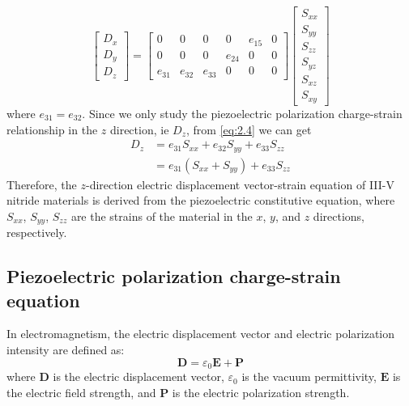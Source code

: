 \begin{equation}
\begin{bmatrix}
D_{x} \\
D_{y} \\
D_{z}
\end{bmatrix}=\begin{bmatrix}
0 & 0 & 0 & 0 & e_{15} & 0 \\
0 & 0 & 0 & e_{24} & 0 & 0 \\
e_{31} & e_{32} & e_{33} & 0 & 0 & 0
\end{bmatrix}\begin{bmatrix}
S_{x x} \\
S_{y y} \\
S_{z z} \\
S_{y z} \\
S_{x z} \\
S_{x y}
\end{bmatrix}
\label{eq:2.4}
\end{equation}
where $𝑒_{31} = 𝑒_{32}$. Since we only study the  piezoelectric polarization charge-strain  relationship in the $z$ direction, ie $D_{z}$, from \autoref{eq:2.4} we can get
\begin{equation}
\begin{aligned}
D_{z} &=e_{31} S_{x x}+e_{32} S_{y y}+e_{33} S_{z z} \\
&=e_{31}\left(S_{x x}+S_{y y}\right)+e_{33} S_{z z}
\end{aligned}
\label{eq:2.5}
\end{equation}
Therefore, the $z$-direction  electric displacement vector-strain  equation of III-V nitride  materials is derived from the piezoelectric  constitutive equation, where $S_{x x}$, $S_{y y}$, $S_{z z}$ are the strains of the material in the $x$, $y$, and $z$ directions, respectively.

\subsection{Piezoelectric polarization charge-strain equation}
\label{sec:Piezoelectric polarization-strain equation}

In electromagnetism, the electric displacement vector and electric polarization intensity are defined as:
\begin{equation}
\mathbf{D}=\varepsilon_{0} \mathbf{E}+\mathbf{P}
\label{eq:2.6}
\end{equation}
where $\mathbf{D}$ is the electric displacement  vector, $\varepsilon_{0}$ is the  vacuum permittivity, $\mathbf{E}$ is the electric field  strength, and $\mathbf{P}$ is the electric polarization  strength.

